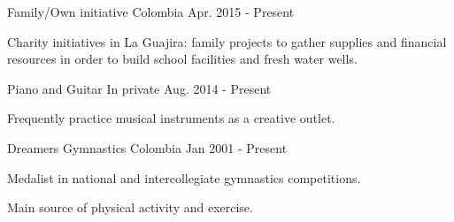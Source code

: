 \begin{cventries}
	{Family/Own initiative} %
	{Colombia} %
	{Apr. 2015 {-} Present} %
	{
		\begin{cvitems} %
			\item {Charity initiatives in La Guajira: family projects to gather supplies and financial resources in
			            order to build school facilities and fresh water wells.}
		\end{cvitems}
	}

	{Piano and Guitar} %
	{In private} %
	{Aug. 2014 {-} Present} %
	{
		\begin{cvitems} %
			\item {Frequently practice musical instruments as a creative outlet.}
		\end{cvitems}
	}

	{Dreamers Gymnastics} %
	{Colombia} %
	{Jan 2001 {-} Present} %
	{
		\begin{cvitems} %
			\item {Medalist in national and intercollegiate gymnastics competitions.}
			\item {Main source of physical activity and exercise.}
		\end{cvitems}
	}




\end{cventries}
